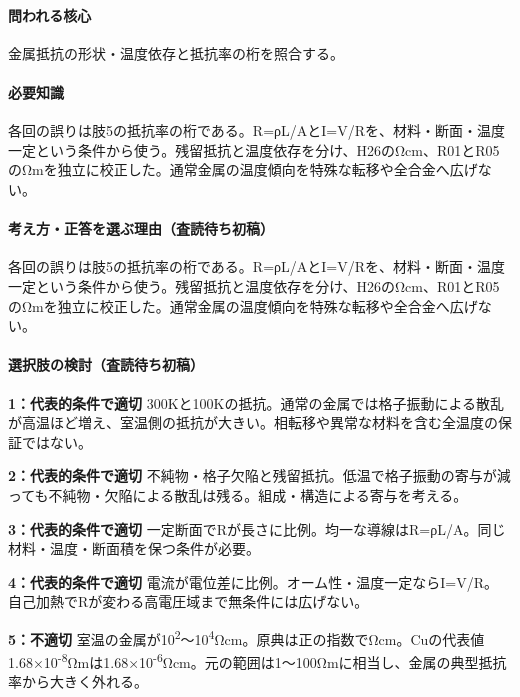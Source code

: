 \paragraph{問われる核心} 金属抵抗の形状・温度依存と抵抗率の桁を照合する。

\paragraph{必要知識} 各回の誤りは肢5の抵抗率の桁である。R=ρL/AとI=\allowbreak{}V/Rを、材料・断面・温度一定という条件から使う。残留抵抗と温度依存を分け、H26のΩcm、R01とR05のΩmを独立に校正した。通常金属の温度傾向を特殊な転移や全合金へ広げない。

\paragraph{考え方・正答を選ぶ理由（査読待ち初稿）} 各回の誤りは肢5の抵抗率の桁である。R=ρL/AとI=\allowbreak{}V/Rを、材料・断面・温度一定という条件から使う。残留抵抗と温度依存を分け、H26のΩcm、R01とR05のΩmを独立に校正した。通常金属の温度傾向を特殊な転移や全合金へ広げない。

\paragraph{選択肢の検討（査読待ち初稿）}\mbox{}\par

\noindent\textbf{1：代表的条件で適切} 300Kと100Kの抵抗。通常の金属では格子振動による散乱が高温ほど増え、室温側の抵抗が大きい。相転移や異常な材料を含む全温度の保証ではない。\par

\noindent\textbf{2：代表的条件で適切} 不純物・格子欠陥と残留抵抗。低温で格子振動の寄与が減っても不純物・欠陥による散乱は残る。組成・構造による寄与を考える。\par

\noindent\textbf{3：代表的条件で適切} 一定断面でRが長さに比例。均一な導線はR=ρL/A。同じ材料・温度・断面積を保つ条件が必要。\par

\noindent\textbf{4：代表的条件で適切} 電流が電位差に比例。オーム性・温度一定ならI=\allowbreak{}V/R。自己加熱でRが変わる高電圧域まで無条件には広げない。\par

\noindent\textbf{5：不適切} 室温の金属が10\textsuperscript{2}〜10\textsuperscript{4}Ωcm。原典は正の指数でΩcm。Cuの代表値1.68×10\textsuperscript{-8}Ωmは1.68×10\textsuperscript{-6}Ωcm。元の範囲は1〜100Ωmに相当し、金属の典型抵抗率から大きく外れる。\par

